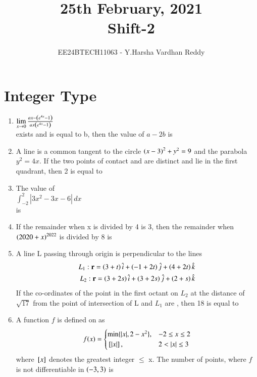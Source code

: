 \documentclass[journal,,12pt,onecolumn]{IEEEtran}
\theoremstyle{remark}
\begin{document}

\vspace{3cm}

\title{25th February, 2021\\Shift-2}
\author{EE24BTECH11063 - Y.Harsha Vardhan Reddy}
\maketitle

\bigskip

\renewcommand{\thefigure}{\theenumi}
\renewcommand{\thetable}{\theenumi}


\section*{Integer Type}
\begin{enumerate}
 \item $\lim \limits_{x\to 0} \frac{ax-\left(e^{4x}-1\right)}{ax\left(e^{4x}-1\right)} $\\
 exists and is equal to b, then the value of $a-2b$ is
 \item A line is a common tangent to the circle $\left(x-3\right)^2+y^2=9$ and the parabola $y^2=4x$. If the two points of contact  and  are distinct and lie in the first quadrant, then 2 is equal to
 \item The value of \\
 $\int_{-2}^{2} |3x^2-3x-6| \, dx$\\
 is
 \item If the remainder when x is divided by 4 is 3, then the remainder when $\left(2020+x\right)^{2022}$ is divided by 8 is

 \item A line L passing through origin is perpendicular to the lines 
 \begin{align*}
     L_1:\mathbf{r}=\left(3+t\right)\hat{i}+\left(-1+2t\right)\hat{j}+\left(4+2t\right)\hat{k}\\
     L_2:\mathbf{r}=\left(3+2s\right)\hat{i}+\left(3+2s\right)\hat{j}+\left(2+s\right)\hat{k}
 \end{align*}
 If the co-ordinates of the point in the first octant on $L_2$ at the distance of $\sqrt{17}$ from the point of intersection of L and $L_1$ are , then 18 is equal to
 \item A function $f$ is defined on  as\\
 \[
f(x) = 
\begin{cases} 
\min\{|x|, 2 - x^2\}, & -2 \leq x \leq 2 \\
{}\left[|x|\right], & 2 < |x| \leq 3 
\end{cases}
\]
where ${}\left[x\right]$ denotes the greatest integer $\le$ x. The number of points, where $f$ is not differentiable in $\left(-3,3\right)$ is
 

\end{enumerate}
\end{document}
